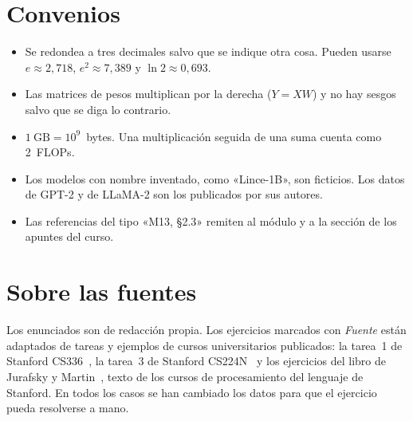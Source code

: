 \section*{Convenios}
\begin{itemize}[leftmargin=1.4em,label=\textendash]
  \item Se redondea a tres decimales salvo que se indique otra cosa. Pueden usarse $e\approx 2{,}718$, $e^{2}\approx 7{,}389$ y $\ln 2\approx 0{,}693$.
  \item Las matrices de pesos multiplican por la derecha ($Y=XW$) y no hay sesgos salvo que se diga lo contrario.
  \item $1~\mathrm{GB}=10^{9}$~bytes. Una multiplicación seguida de una suma cuenta como 2~FLOPs.
  \item Los modelos con nombre inventado, como «Lince-1B», son ficticios. Los datos de GPT-2 y de LLaMA-2 son los publicados por sus autores.
  \item Las referencias del tipo «M13, §2.3» remiten al módulo y a la sección de los apuntes del curso.
\end{itemize}

\section*{Sobre las fuentes}
Los enunciados son de redacción propia. Los ejercicios marcados con \emph{Fuente} están adaptados de tareas y ejemplos de cursos universitarios publicados: la tarea~1 de Stanford CS336~\cite{cs336}, la tarea~3 de Stanford CS224N~\cite{cs224n} y los ejercicios del libro de Jurafsky y Martin~\cite{jm3}, texto de los cursos de procesamiento del lenguaje de Stanford. En todos los casos se han cambiado los datos para que el ejercicio pueda resolverse a mano.
